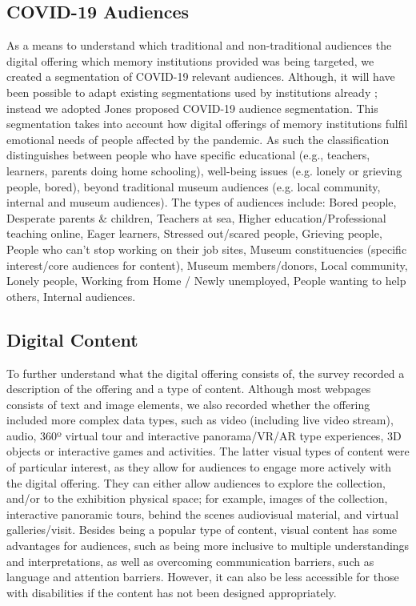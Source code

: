 \documentclass{egpubl}
\begin{document}
\subsection{COVID-19 Audiences}
As a means to understand which traditional and non-traditional audiences the digital offering which memory institutions provided was being targeted, we created a segmentation of COVID-19 relevant audiences. Although, it will have been possible to adapt existing segmentations used by institutions already \cite{Drot19}; instead we adopted Jones \cite{Audiences2020} proposed COVID-19 audience segmentation. This segmentation takes into account how digital offerings of memory institutions fulfil emotional needs of people affected by the pandemic. As such the classification distinguishes between people who have specific educational (e.g., teachers, learners, parents doing home schooling), well-being issues (e.g. lonely or grieving  people, bored), beyond traditional museum audiences (e.g. local community, internal and museum audiences). The types of audiences include: Bored people, Desperate parents \& children, Teachers at sea, Higher education/Professional teaching online, Eager learners, Stressed out/scared people, Grieving people, People who can’t stop working on their job sites, Museum constituencies (specific interest/core audiences for content), Museum members/donors, Local community, Lonely people, Working from Home / Newly unemployed, People wanting to help others, Internal audiences.

\subsection{Digital Content}
To further understand what the digital offering consists of, the survey recorded a description of the offering and a type of content. Although most webpages consists of text and image elements, we also recorded whether the offering included more complex data types, such as video (including live video stream), audio, 360º virtual tour and interactive panorama/VR/AR type experiences, 3D objects or interactive games and activities. The latter visual types of content were of particular interest, as they allow for audiences to engage more actively with the digital offering. They can either allow audiences to explore the collection, and/or to the exhibition physical space; for example, images of the collection, interactive panoramic tours,  behind the scenes audiovisual material, and virtual galleries/visit. Besides being a popular type of content, visual content has some advantages for audiences, such as being more inclusive to multiple understandings and interpretations, as well as overcoming communication barriers, such as language and attention barriers. However, it can also be less accessible for those with disabilities if the content has not been designed appropriately.
\end{document}
